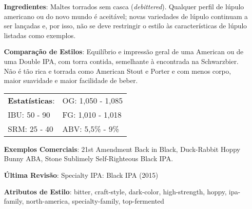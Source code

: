 \textbf{Ingredientes}: Maltes torrados sem casca (\textit{debittered}). Qualquer perfil de lúpulo americano ou do novo mundo é aceitável; novas variedades de lúpulo continuam a ser lançadas e, por isso, não se deve restringir o estilo às características de lúpulo listadas como exemplos.

\textbf{Comparação de Estilos}: Equilíbrio e impressão geral de uma American ou de uma Double IPA, com torra contida, semelhante à encontrada na Schwarzbier. Não é tão rica e torrada como American Stout e Porter e com menos corpo, maior suavidade e maior facilidade de beber.

\begin{tabular}{@{}p{35mm}p{35mm}@{}}
  \textbf{Estatísticas}: & OG: 1,050 - 1,085 \\
  IBU: 50 - 90  & FG: 1,010 - 1,018 \\
  SRM: 25 - 40  & ABV: 5,5\% - 9\%
\end{tabular}

\textbf{Exemplos Comerciais}: 21st Amendment Back in Black, Duck-Rabbit Hoppy Bunny ABA, Stone Sublimely Self-Righteous Black IPA.

\textbf{Última Revisão}: Specialty IPA: Black IPA (2015)

\textbf{Atributos de Estilo}: bitter, craft-style, dark-color, high-strength, hoppy, ipa-family, north-america, specialty-family, top-fermented
